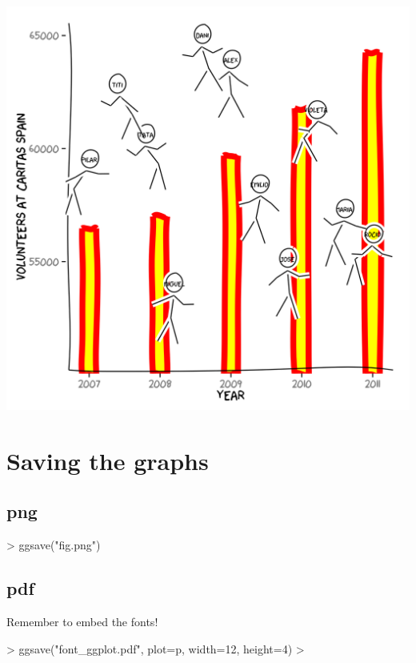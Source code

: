 \documentclass[10pt]{article}
\begin{document}
\begin{center}
\includegraphics{xkcd-intro-CaritasSpain}
\end{center}

\section{Saving the graphs}

\subsection{png}

\begin{Schunk}
\begin{Sinput}
> ggsave("fig.png")
\end{Sinput}
\end{Schunk}

\subsection{pdf}

Remember to embed the fonts!

\begin{Schunk}
\begin{Sinput}
> ggsave("font_ggplot.pdf", plot=p,  width=12, height=4)
> 
\end{Sinput}
\end{Schunk}
\end{document}
